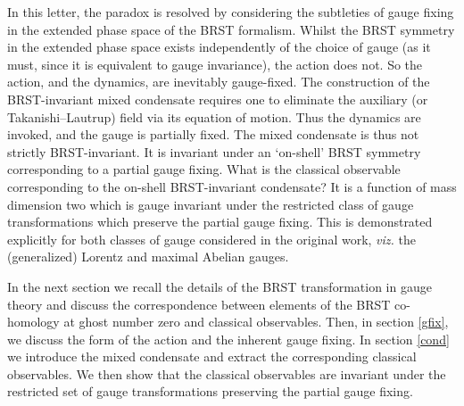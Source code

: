 \documentclass[a4paper,a4paper]{article}
\begin{document}
In this letter, the paradox is resolved by considering the subtleties of gauge fixing in the extended phase space of the BRST formalism. Whilst the BRST symmetry in the extended phase space exists independently of the choice of gauge (as it must, since it is equivalent to gauge invariance), the action does not. So the action, and the dynamics, are inevitably gauge-fixed. The construction of the BRST-invariant mixed condensate \cite{Kondo:2001nq} requires one to eliminate the auxiliary (or Takanishi--Lautrup) field via its equation of motion. Thus the dynamics are invoked, and the gauge is partially fixed. The mixed condensate is thus not strictly BRST-invariant. It is invariant under an `on-shell' BRST symmetry corresponding to a partial gauge fixing. What is the classical observable corresponding to the on-shell BRST-invariant condensate? It is a function of mass dimension two which is gauge invariant under the restricted class of gauge transformations which preserve the partial gauge fixing. This is demonstrated explicitly for both classes of gauge considered in the original work, \emph{viz.} the (generalized) Lorentz \cite{Curci:1976bt,Baulieu:1982sb,Baulieu:1985tg} and maximal Abelian \cite{'tHooft:1981ht,Kronfeld:1987vd,Kronfeld:1987ri,Kondo:1998pc,Kondo:1998nw} gauges.

In the next section we recall the details of the BRST transformation in \coordHE{} gauge theory and discuss the correspondence between elements of the BRST co-homology at ghost number zero and classical observables. 
Then, in section \ref{gfix}, we discuss the form of the action and the inherent gauge fixing. In section \ref{cond} we introduce the mixed condensate and extract the corresponding classical observables. We then show that the classical observables are invariant under the restricted set of gauge transformations preserving the partial gauge fixing. 
%
%
%
%
%
\end{document}
